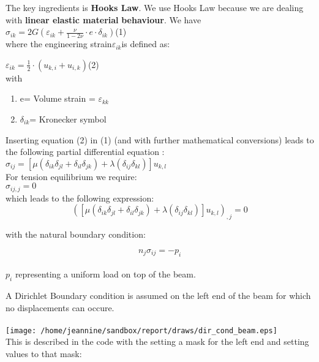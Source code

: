 The key ingredients is \textbf{Hooks Law}. We use Hooks Law because
we are dealing with \textbf{linear elastic material} \textbf{behaviour}.
We have \\


$\sigma_{ik}=2G\left(\varepsilon_{ik}+\frac{\nu}{1-2\nu}\cdot e\cdot\delta_{ik}\right)$\hfill{}(1)\\
where the engineering strain$\varepsilon_{ik}$is defined as:

$\varepsilon_{ik}=\frac{1}{2}\cdot\left(u_{k,i}+u_{i,k}\right)$\hfill{}(2)\\


with

\begin{enumerate}
\item e= Volume strain = $\varepsilon_{kk}$
\item $\delta_{ik}$= Kronecker symbol
\end{enumerate}
Inserting equation (2) in (1) (and with further mathematical conversions)
leads to the following partial differential equation :\\


$\sigma_{ij}=\left[\mu\left(\delta_{ik}\delta_{jl}+\delta_{il}\delta_{jk}\right)+\lambda\left(\delta_{ij}\delta_{kl}\right)\right]u_{k,l}$\\


For tension equilibrium we require:\\


$\sigma_{ij,j}=0$\\


which leads to the following expression:\\


\[
\left(\left[\mu\left(\delta_{ik}\delta_{jl}+\delta_{il}\delta_{jk}\right)+\lambda\left(\delta_{ij}\delta_{kl}\right)\right]u_{k,l}\right)_{,j}=0\]


with the natural boundary condition:

\[
n_{j}\sigma_{ij}=-p_{i}\]
\\
$p_{i}$ representing a uniform load on top of the beam.

A Dirichlet Boundary condition is assumed on the left end of the beam
for which no displacements can occure.\\
\\
\texttt{[image: /home/jeannine/sandbox/report/draws/dir\_cond\_beam.eps]}\\
This is described in the code with the setting a mask for the left
end and setting values to that mask:


